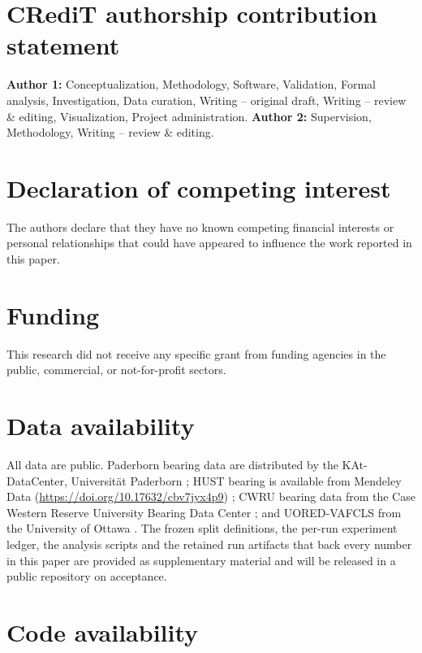 \section*{CRediT authorship contribution statement}
\textbf{Author 1:} Conceptualization, Methodology, Software, Validation, Formal analysis, Investigation, Data curation,
Writing -- original draft, Writing -- review \& editing, Visualization, Project administration.
\textbf{Author 2:} Supervision, Methodology, Writing -- review \& editing.

\section*{Declaration of competing interest}

The authors declare that they have no known competing financial interests or personal relationships that could have
appeared to influence the work reported in this paper.

\section*{Funding}
This research did not receive any specific grant from funding agencies in the public, commercial, or not-for-profit
sectors.

\section*{Data availability}

All data are public. Paderborn bearing data are distributed by the KAt-DataCenter, Universit\"at Paderborn
\cite{lessmeier2016}; HUST bearing is available from Mendeley Data (\url{https://doi.org/10.17632/cbv7jyx4p9})
\cite{thuan2023hust}; CWRU bearing data from the Case Western Reserve University Bearing Data Center \cite{smith2015}; and
UORED-VAFCLS from the University of Ottawa \cite{sehri2023uored}. The frozen split definitions, the per-run experiment
ledger, the analysis scripts and the retained run artifacts that back every number in this paper are provided as
supplementary material and will be released in a public repository on acceptance.

\section*{Code availability}

